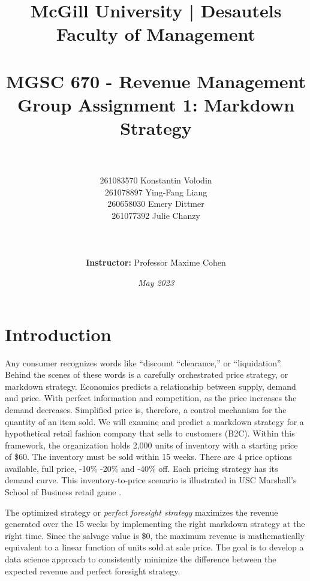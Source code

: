 \documentclass[11pt,a4paper]{article}
\title{
\large{McGill University | Desautels Faculty of Management}\\
\hfill \break
\hfill \break
\hfill \break
\hfill \break
\\\Large MGSC 670 - Revenue Management\\
\textbf{Group Assignment 1: Markdown Strategy}\\
\hfill \break
\hfill \break
}
\author{\\\\
261083570 Konstantin Volodin\\
261078897 Ying-Fang Liang\\
260658030 Emery Dittmer\\
261077392 Julie Chanzy\\\\
\hfill \break
\\\\\textbf{Instructor:} Professor Maxime Cohen\\
\hfill \break
}
\date{\emph{May 2023}}
\begin{document}
\maketitle
\thispagestyle{empty}
\pagebreak

\tableofcontents
{}
\pagebreak

\setcounter{page}{1}
\section{Introduction}
Any consumer recognizes words like “discount “clearance,” or “liquidation”. Behind the scenes of these words is a carefully orchestrated price strategy, or markdown strategy. 
Economics predicts a relationship between supply, demand and price. With perfect information and competition, as the price increases the demand decreases. 
Simplified price is, therefore, a control mechanism for the quantity of an item sold. 
We will examine and predict a markdown strategy for a hypothetical retail fashion company that sells to customers (B2C). 
Within this framework, the organization holds 2,000 units of inventory with a starting price of \$60. 
The inventory must be sold within 15 weeks. There are 4 price options available, full price, -10\% -20\% and -40\% off. 
Each pricing strategy has its demand curve. This inventory-to-price scenario is illustrated in USC Marshall’s School of Business retail game \cite{RetailerGame}. 

The optimized strategy or \emph{perfect foresight strategy} maximizes the revenue generated over the 15 weeks by implementing the right markdown strategy at the right time. Since the salvage value is \$0, the maximum revenue is mathematically equivalent to a linear function of units sold at sale price. The goal is to develop a data science approach to consistently minimize the difference between the expected revenue and perfect foresight strategy.  
\end{document}
